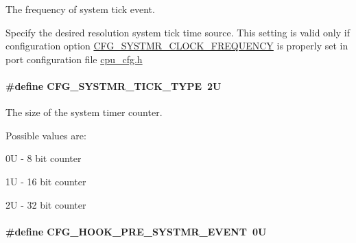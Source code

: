 The frequency of system tick event. 

Specify the desired resolution system tick time source. This setting is valid only if configuration option \hyperlink{group__template__cpu__cfg_gac85c592962ba2c968d13f867533196a1}{C\-F\-G\-\_\-\-S\-Y\-S\-T\-M\-R\-\_\-\-C\-L\-O\-C\-K\-\_\-\-F\-R\-E\-Q\-U\-E\-N\-C\-Y} is properly set in port configuration file \hyperlink{cpu__cfg_8h}{cpu\-\_\-cfg.\-h} \hypertarget{group__template__kern__cfg_gad69eef523459c5ab485ce2f62bddceca}{
\paragraph[{C\-F\-G\-\_\-\-S\-Y\-S\-T\-M\-R\-\_\-\-T\-I\-C\-K\-\_\-\-T\-Y\-P\-E}]{\setlength{\rightskip}{0pt plus 5cm}\#define C\-F\-G\-\_\-\-S\-Y\-S\-T\-M\-R\-\_\-\-T\-I\-C\-K\-\_\-\-T\-Y\-P\-E~2\-U}}\label{group__template__kern__cfg_gad69eef523459c5ab485ce2f62bddceca}


The size of the system timer counter. 

Possible values are\-:
\begin{DoxyItemize}
\item 0\-U -\/ 8 bit counter
\item 1\-U -\/ 16 bit counter
\item 2\-U -\/ 32 bit counter 
\end{DoxyItemize}\hypertarget{group__template__kern__cfg_gaa130bc9f72010b44b4b06618d8f8d0bc}{
\paragraph[{C\-F\-G\-\_\-\-H\-O\-O\-K\-\_\-\-P\-R\-E\-\_\-\-S\-Y\-S\-T\-M\-R\-\_\-\-E\-V\-E\-N\-T}]{\setlength{\rightskip}{0pt plus 5cm}\#define C\-F\-G\-\_\-\-H\-O\-O\-K\-\_\-\-P\-R\-E\-\_\-\-S\-Y\-S\-T\-M\-R\-\_\-\-E\-V\-E\-N\-T~0\-U}}\label{group__template__kern__cfg_gaa130bc9f72010b44b4b06618d8f8d0bc}


